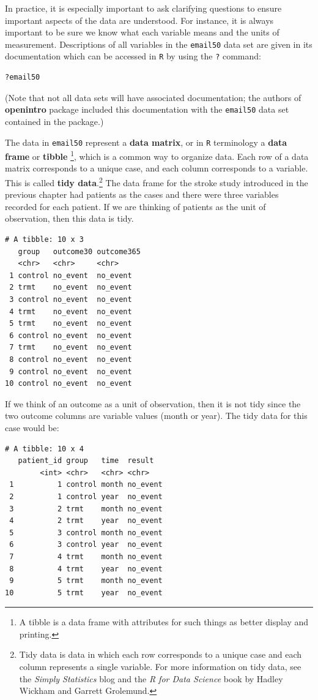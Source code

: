 \documentclass[
  letterpaper,
  DIV=11,
  numbers=noendperiod]{scrreprt}
\begin{document}
In practice, it is especially important to ask clarifying questions to
ensure important aspects of the data are understood. For instance, it is
always important to be sure we know what each variable means and the
units of measurement. Descriptions of all variables in the
\texttt{email50} data set are given in its documentation which can be
accessed in \texttt{R} by using the \texttt{?} command:

\begin{verbatim}
?email50
\end{verbatim}

(Note that not all data sets will have associated documentation; the
authors of \textbf{openintro} package included this documentation with
the \texttt{email50} data set contained in the package.)

The data in \texttt{email50} represent a \textbf{data matrix}, or in
\texttt{R} terminology a \textbf{data frame} or \textbf{tibble}
\footnote{A tibble is a data frame with attributes for such things as
  better display and printing.}, which is a common way to organize data.
Each row of a data matrix corresponds to a unique case, and each column
corresponds to a variable. This is called \textbf{tidy data}.\footnote{Tidy
  data is data in which each row corresponds to a unique case and each
  column represents a single variable. For more information on tidy
  data, see the \emph{Simply Statistics} blog and the \emph{R for Data
  Science} book by Hadley Wickham and Garrett Grolemund.} The data frame
for the stroke study introduced in the previous chapter had patients as
the cases and there were three variables recorded for each patient. If
we are thinking of patients as the unit of observation, then this data
is tidy.

\begin{verbatim}
# A tibble: 10 x 3
   group   outcome30 outcome365
   <chr>   <chr>     <chr>     
 1 control no_event  no_event  
 2 trmt    no_event  no_event  
 3 control no_event  no_event  
 4 trmt    no_event  no_event  
 5 trmt    no_event  no_event  
 6 control no_event  no_event  
 7 trmt    no_event  no_event  
 8 control no_event  no_event  
 9 control no_event  no_event  
10 control no_event  no_event  
\end{verbatim}

If we think of an outcome as a unit of observation, then it is not tidy
since the two outcome columns are variable values (month or year). The
tidy data for this case would be:

\begin{verbatim}
# A tibble: 10 x 4
   patient_id group   time  result  
        <int> <chr>   <chr> <chr>   
 1          1 control month no_event
 2          1 control year  no_event
 3          2 trmt    month no_event
 4          2 trmt    year  no_event
 5          3 control month no_event
 6          3 control year  no_event
 7          4 trmt    month no_event
 8          4 trmt    year  no_event
 9          5 trmt    month no_event
10          5 trmt    year  no_event
\end{verbatim}
\end{document}
